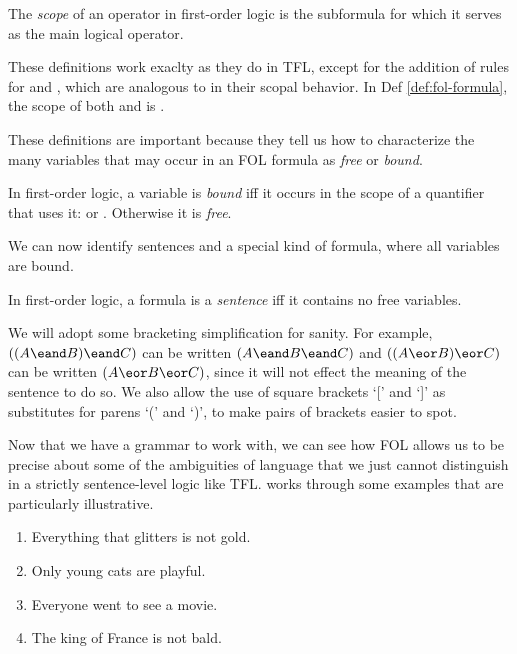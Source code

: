 \begin{definition}[Scope]
  \label{def:fol-scope}
  The \emph{scope} of an operator in first-order logic is the subformula for
  which it serves as the main logical operator.
\end{definition}

These definitions work exaclty as they do in TFL, except for the addition of
rules for \eforall and \eexists, which are analogous to \enot in their scopal
behavior. In Def \ref{def:fol-formula}, the scope of both
\eforall\ealpha and \eexists\ealpha is \ephi.

These definitions are important because they tell us how to characterize the
many variables that may occur in an FOL formula as \emph{free} or \emph{bound}.

\begin{definition}
  \label{def:fol-bound-variable}
  In first-order logic, a variable \ealpha is \emph{bound} iff it occurs in
  the scope of a quantifier that uses it: \eforall\ealpha or \eexists\ealpha.
  Otherwise it is \emph{free}.
\end{definition}

We can now identify sentences and a special kind of formula, where all variables
are bound.

\begin{definition}[Sentence]
  \label{def:fol-sentence}
  In first-order logic, a formula \ephi is a \emph{sentence} iff it contains
  no free variables.
\end{definition}

We will adopt some bracketing simplification for sanity. For example,
$((A\eand B)\eand C)$ can be written $(A\eand B\eand C)$ and
$((A\eor B)\eor C)$ can be written $(A\eor B\eor C)$, since it will not
effect the meaning of the sentence to do so. We also allow the use of square
brackets `[' and `]' as substitutes for parens `(' and `)', to make pairs of
brackets easier to spot.

Now that we have a grammar to work with, we can see how FOL allows us to be
precise about some of the ambiguities of language that we just cannot
distinguish in a strictly sentence-level logic like TFL.
\cite[Chapter 29]{Mag25} works through some examples that are
particularly illustrative.

\begin{enumerate}
\item Everything that glitters is not gold.
\item Only young cats are playful.
\item Everyone went to see a movie.
\item The king of France is not bald.
\end{enumerate}

